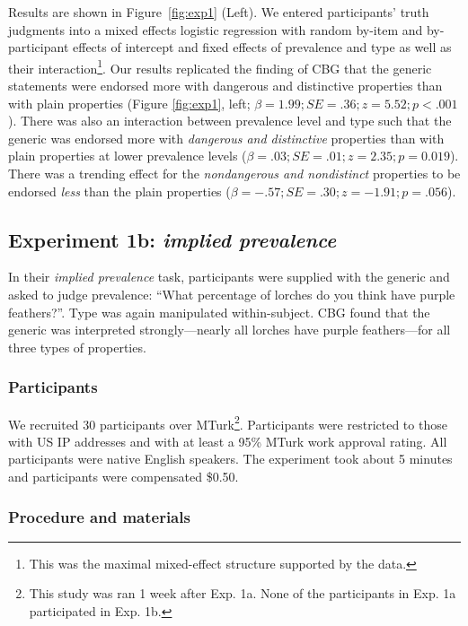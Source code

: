 \documentclass[10pt,letterpaper]{article}
\begin{document}
Results are shown in Figure~\ref{fig:exp1} (Left). We entered participants' truth judgments into a mixed effects logistic regression with random by-item and by-participant effects of intercept and fixed effects of prevalence and type as well as their interaction\footnote{This was the maximal mixed-effect structure supported by the data.}.  
%
Our results replicated the finding of CBG that the generic statements were endorsed more with dangerous and distinctive properties than with plain properties (Figure \ref{fig:exp1}, left; $\beta=1.99; SE = .36; z = 5.52; p < .001$). 
%
There was also an interaction between prevalence level and type such that the generic was endorsed more with \emph{dangerous and distinctive} properties than with plain properties at lower prevalence levels ($\beta=.03; SE = .01; z=2.35; p = 0.019$). There was a trending effect for the \emph{nondangerous and nondistinct} properties to be endorsed \emph{less} than the plain properties ($\beta=-.57; SE = .30; z=-1.91; p = .056$).

\subsection{Experiment 1b: \emph{implied prevalence}}

In their \emph{implied prevalence} task, participants were supplied with the generic and asked to judge prevalence: ``What percentage of lorches do you think have purple feathers?''. Type was again manipulated within-subject. CBG found that the generic was interpreted strongly---nearly all lorches have purple feathers---for all three types of properties.

\subsubsection{Participants}

We recruited 30 participants over MTurk\footnote{This study was ran 1 week after Exp. 1a. None of the participants in Exp. 1a participated in Exp. 1b.}.  Participants were restricted to those with US IP addresses and with at least a 95\% MTurk work approval rating. All participants were native English speakers. The experiment took about 5 minutes and participants were compensated \$0.50.

\subsubsection{Procedure and materials}
\end{document}
